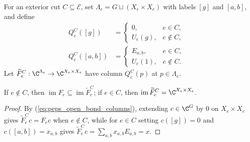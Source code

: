 \begin{definition}%
    \label{def:peps_open_bond_generators}
    \leanok
    For an exterior cut $C\subseteq\mathcal E$, set
    $\Lambda_e=G\sqcup(X_e\times X_e)$ with labels $[g]$ and $[a,b]$, and define
    \begin{align}
        Q_e^C([g])   & =
        \begin{cases}0,&e\in C,\\U_e(g),&e\notin C,\end{cases}
        \label{eq:peps_open_bond_columns} \\
        Q_e^C([a,b]) & =
        \begin{cases}E_{a,b},&e\in C,\\U_e(1),&e\notin C.\end{cases}
        \nonumber
    \end{align}
    Let $\widetilde F_e^C:\C^{\Lambda_e}\to\C^{X_e\times X_e}$ have column
    $Q_e^C(p)$ at $p\in\Lambda_e$.
\end{definition}

\begin{lemma}%
    \label{thm:peps_open_bond_ranges}
    \leanok
    If $e\notin C$, then
    $\operatorname{im}F_e\subseteq\operatorname{im}\widetilde F_e^C$; if
    $e\in C$, then $\operatorname{im}\widetilde F_e^C=\C^{X_e\times X_e}$.
\end{lemma}
\begin{proof}\leanok
    By (\ref{eq:peps_open_bond_columns}), extending $c\in\C^G$ by $0$ on
    $X_e\times X_e$ gives $\widetilde F_e^Cc=F_ec$ when $e\notin C$, while for
    $e\in C$ setting $c([g])=0$ and $c([a,b])=x_{a,b}$ gives
    $\widetilde F_e^Cc=\sum_{a,b}x_{a,b}E_{a,b}=x$.
\end{proof}

